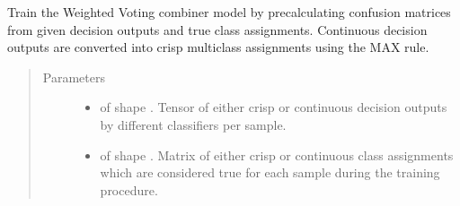\documentclass[letterpaper,10pt,english]{sphinxmanual}
\begin{document}
\begin{fulllineitems}
\begin{fulllineitems}
\begin{quote}
\begin{description}
\end{description}\end{quote}

\end{fulllineitems}


\begin{fulllineitems}
\label{\detokenize{pusion.core.weighted_voting_combiner:pusion.core.weighted_voting_combiner.WeightedVotingCombiner.train}}
\sphinxAtStartPar
Train the Weighted Voting combiner model by precalculating confusion matrices from given decision outputs and
true class assignments. Continuous decision outputs are converted into crisp multiclass assignments using
the MAX rule.
\begin{quote}\begin{description}
\item[{Parameters}] \leavevmode\begin{itemize}
\item {} 
\sphinxAtStartPar
{} \textendash{}  of shape .
Tensor of either crisp or continuous decision outputs by different classifiers per sample.

\item {} 
\sphinxAtStartPar
{} \textendash{}  of shape .
Matrix of either crisp or continuous class assignments which are considered true for each sample during
the training procedure.

\end{itemize}

\end{description}\end{quote}

\end{fulllineitems}



\end{fulllineitems}
\end{document}
